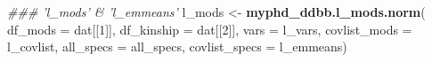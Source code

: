 \documentclass[
  10pt,
]{article}
\newenvironment{Shaded}{\begin{snugshade}}{\end{snugshade}}
\newcommand{\CommentTok}[1]{\textcolor[rgb]{0.56,0.35,0.01}{\textit{#1}}}
\newcommand{\DataTypeTok}[1]{\textcolor[rgb]{0.13,0.29,0.53}{#1}}
\newcommand{\DecValTok}[1]{\textcolor[rgb]{0.00,0.00,0.81}{#1}}
\newcommand{\KeywordTok}[1]{\textcolor[rgb]{0.13,0.29,0.53}{\textbf{#1}}}
\newcommand{\NormalTok}[1]{#1}
\newcommand{\StringTok}[1]{\textcolor[rgb]{0.31,0.60,0.02}{#1}}
\begin{document}
\newline

\begin{Shaded}
\begin{Highlighting}[]
\CommentTok{### 'l_mods' & 'l_emmeans'}
\NormalTok{    l_mods <-}\StringTok{ }\KeywordTok{myphd_ddbb.l_mods.norm}\NormalTok{(}
        \DataTypeTok{df_mods =}\NormalTok{ dat[[}\DecValTok{1}\NormalTok{]],}
        \DataTypeTok{df_kinship =}\NormalTok{ dat[[}\DecValTok{2}\NormalTok{]],}
        \DataTypeTok{vars =}\NormalTok{ l_vars,}
        \DataTypeTok{covlist_mods =}\NormalTok{ l_covlist,}
        \DataTypeTok{all_specs =}\NormalTok{ all_specs,}
        \DataTypeTok{covlist_specs =}\NormalTok{ l_emmeans)}
\end{Highlighting}
\end{Shaded}
\end{document}
